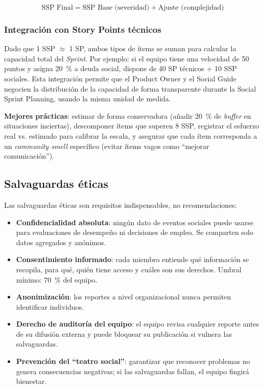 $$ \text{SSP Final} = \text{SSP Base (severidad)} + \text{Ajuste (complejidad)} $$

\subsubsection{Integración con Story Points técnicos}

Dado que 1 SSP $\approx$ 1 SP, ambos tipos de ítems se suman para calcular la capacidad total del \textit{Sprint}. Por ejemplo: si el equipo tiene una velocidad de 50 puntos y asigna 20~\% a deuda social, dispone de 40 SP técnicos + 10 SSP sociales. Esta integración permite que el Product Owner y el Social Guide negocien la distribución de la capacidad de forma transparente durante la Social Sprint Planning, usando la misma unidad de medida.

\textbf{Mejores prácticas}: estimar de forma conservadora (añadir 20~\% de \textit{buffer} en situaciones inciertas), descomponer ítems que superen 8 SSP, registrar el esfuerzo real vs. estimado para calibrar la escala, y asegurar que cada ítem corresponda a un \textit{community smell} específico (evitar ítems vagos como ``mejorar comunicación'').

\subsection{Salvaguardas éticas}

Las salvaguardas éticas son requisitos indispensables, no recomendaciones:

\begin{itemize}
    \item \textbf{Confidencialidad absoluta}: ningún dato de eventos sociales puede usarse para evaluaciones de desempeño ni decisiones de empleo. Se comparten solo datos agregados y anónimos.
    \item \textbf{Consentimiento informado}: cada miembro entiende qué información se recopila, para qué, quién tiene acceso y cuáles son sus derechos. Umbral mínimo: 70~\% del equipo.
    \item \textbf{Anonimización}: los reportes a nivel organizacional nunca permiten identificar individuos.
    \item \textbf{Derecho de auditoría del equipo}: el equipo revisa cualquier reporte antes de su difusión externa y puede bloquear su publicación si vulnera las salvaguardas.
    \item \textbf{Prevención del ``teatro social''}: garantizar que reconocer problemas no genera consecuencias negativas; si las salvaguardas fallan, el equipo fingirá bienestar.
\end{itemize}

